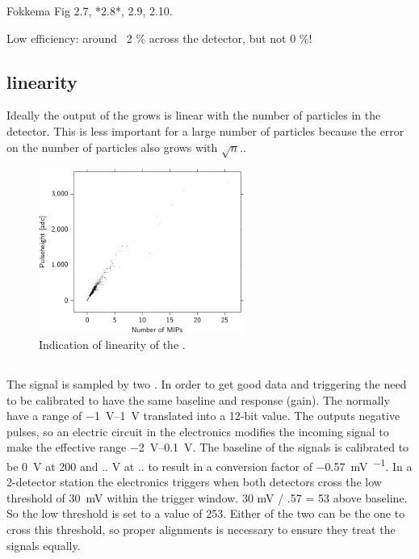 Fokkema Fig 2.7, *2.8*, 2.9, 2.10.

Low efficiency: around ~2 \% across the detector, but not 0 \%!


\subsection{\pmt linearity}

Ideally the output of the \pmt grows is linear with the number of particles in the detector. This is less important for a large number of particles because the error on the number of particles also grows with $\sqrt{n}$..


\begin{figure}
    \centering
    \includegraphics[width=0.6\textwidth]{plots/response/ph_vs_pi.pdf}
    \caption{
             Indication of linearity of the \pmt.}
    \label{fig:transport_time}
\end{figure}


\subsection{\adcs}

The signal is sampled by two \adcs. In order to get good data and
triggering the \adcs need to be calibrated to have the same baseline and
response (gain). The \adcs normally have a range of
\SIrange{-1}{1}{\volt} translated into a 12-bit value. The \pmt outputs
negative pulses, so an electric circuit in the \hisparc electronics
modifies the incoming signal to make the effective \adc range
\SIrange{-2}{0.1}{\volt}. The baseline of the signals is calibrated to
be \SI{0}{\volt} at \SI{200}{\adc} and .. V at .. \Adcs to result in a
conversion factor of \SI{-0.57}{\milli\volt\per\adc}. In a 2-detector
station the \hisparc electronics triggers when both detectors cross the
low threshold of \SI{30}{\milli\volt} within the trigger window. 30 mV /
.57 = 53 above baseline. So the low threshold is set to a value of
\SI{253}{\adc}. Either of the two \adcs can be the one to cross this
threshold, so proper \adc alignments is necessary to ensure they treat
the signals equally.

